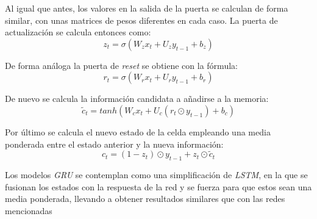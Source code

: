 Al igual que antes, los valores en la salida de la puerta se calculan de forma similar,
con unas matrices de pesos diferentes en cada caso.
La puerta de actualización se calcula entonces como:
\begin{equation}
    z_t = \sigma(W_z x_t + U_z y_{t-1} + b_z)
\end{equation}

De forma análoga la puerta de \textit{reset} se obtiene con la fórmula:
\begin{equation}
    r_t = \sigma(W_r x_t + U_r y_{t-1} + b_r)
\end{equation}

De nuevo se calcula la información candidata a añadirse a la memoria:
\begin{equation}
    \widetilde{c}_t = tanh(W_c x_t + U_c (r_t \odot y_{t-1}) + b_c)
\end{equation}

Por último se calcula el nuevo estado de la celda empleando una media ponderada
entre el estado anterior y la nueva información:
\begin{equation}
    c_t = (1 - z_t) \odot y_{t-1} + z_t \odot \widetilde{c}_t
\end{equation}

Los modelos \textit{GRU} se contemplan como una simplificación de \textit{LSTM},
en la que se fusionan los estados con la respuesta de la red y se fuerza para que estos
sean una media ponderada, llevando a obtener resultados similares que con las redes
mencionadas \cite{book:rue2019}

